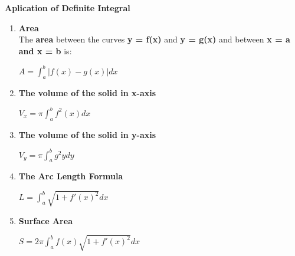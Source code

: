 \documentclass[10pt]{article}
\begin{document}
\pagebreak
\begin{center}
\textbf{Aplication of Definite Integral}
\end{center}
\begin{enumerate}
	\item \textbf{Area}\\
	The \textbf{area} between the curves \textbf{y = f(x)} and \textbf{y = g(x)} and between \textbf{x = a and x = b} is:
	\begin{mybox}
	\begin{center}
	$A = \displaystyle \int_{a}^{b} |f(x) - g(x)|dx$
	\end{center}
	\end{mybox}
	\item \textbf{The volume of the solid in x-axis}
	\begin{mybox}
	\begin{center}
	$V_x = \pi \displaystyle \int_{a}^{b}f^2(x)dx$
	\end{center}
	\end{mybox}
	\item \textbf{The volume of the solid in y-axis}
	\begin{mybox}
	\begin{center}
	$V_y = \pi \displaystyle \int_{a}^{b}g^2ydy$
	\end{center}
	\end{mybox}
	\item \textbf{The Arc Length Formula}
	\begin{mybox}
	\begin{center}
	$L = \displaystyle \int_{a}^{b} \sqrt{1 + f'(x)^2}dx$
	\end{center}
	\end{mybox}
	\item \textbf{Surface Area}
	\begin{mybox}
	\begin{center}
	$S = 2 \pi \displaystyle \int_{a}^{b} f(x) \sqrt{1 + f'(x)^2}dx$
	\end{center}
	\end{mybox}
\end{enumerate} 
\end{document}
